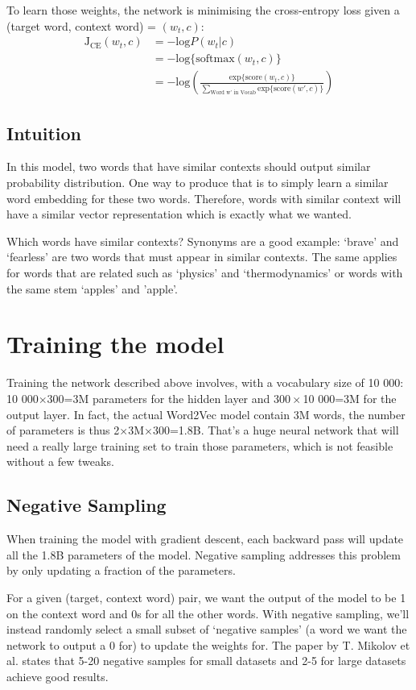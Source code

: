 To learn those weights, the network is minimising the cross-entropy loss given a (target word, context word) = $(w_t, c)$:
\begin{align}
    \text{J}_{\text{CE}}(w_t, c)   &=  -\text{log}P(w_t | c) \nonumber\\
    &= -\text{log}\{\text{softmax}(w_t, c)\}\nonumber\\
    &= -\text{log}\left(\frac{\text{exp}\{\text{score}(w_t, c)\}}{\sum_{\text{Word w' in Vocab}}\text{exp}\{\text{score}(w', c)\}} \right)
\end{align}

\subsection{Intuition}
In this model, two words that have similar contexts should output similar probability distribution. One way to produce that is to simply learn a similar word embedding for these two words. Therefore, words with similar context will have a similar vector representation which is exactly what we wanted.

Which words have similar contexts? Synonyms are a good example: `brave' and `fearless' are two words that must appear in similar contexts. The same applies for words that are related such as `physics' and `thermodynamics' or words with the same stem `apples' and 'apple'. 

\section{Training the model}
Training the network described above involves, with a vocabulary size of 10 000: 10 000$\times300$=3M parameters for the hidden layer and $300\times$10 000=3M for the output layer. In fact, the actual Word2Vec model contain 3M words, the number of parameters is thus 2$\times$3M$\times$300=1.8B. That's a huge neural network that will need a really large training set to train those parameters, which is not feasible without a few tweaks.

\subsection{Negative Sampling}
When training the model with gradient descent, each backward pass will update all the 1.8B parameters of the model. Negative sampling addresses this problem by only updating a fraction of the parameters.

For a given (target, context word) pair, we want the output of the model to be 1 on the context word and 0s for all the other words. With negative sampling, we'll instead randomly select a small subset of `negative samples' (a word we want the network to output a 0 for) to update the weights for. The paper by T. Mikolov et al. \cite{word2vec2} states that 5-20 negative samples for small datasets and 2-5 for large datasets achieve good results.

